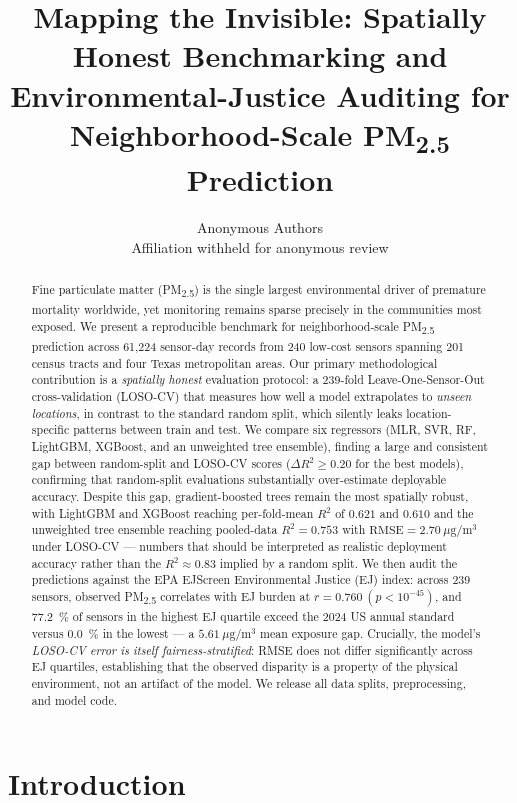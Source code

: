 \documentclass{article}
\title{Mapping the Invisible: Spatially Honest Benchmarking and\\
  Environmental-Justice Auditing for Neighborhood-Scale PM\textsubscript{2.5} Prediction}
\author{%
  Anonymous Authors \\
  Affiliation withheld for anonymous review
}
\begin{document}
\maketitle

\begin{abstract}
Fine particulate matter (PM\textsubscript{2.5}) is the single largest environmental driver of premature mortality worldwide, yet monitoring remains sparse precisely in the communities most exposed. We present a reproducible benchmark for neighborhood-scale PM\textsubscript{2.5} prediction across 61{,}224 sensor-day records from 240 low-cost sensors spanning 201 census tracts and four Texas metropolitan areas. Our primary methodological contribution is a \emph{spatially honest} evaluation protocol: a 239-fold Leave-One-Sensor-Out cross-validation (LOSO-CV) that measures how well a model extrapolates to \emph{unseen locations}, in contrast to the standard random split, which silently leaks location-specific patterns between train and test. We compare six regressors (MLR, SVR, RF, LightGBM, XGBoost, and an unweighted tree ensemble), finding a large and consistent gap between random-split and LOSO-CV scores ($\Delta R^2 \geq 0.20$ for the best models), confirming that random-split evaluations substantially over-estimate deployable accuracy. Despite this gap, gradient-boosted trees remain the most spatially robust, with LightGBM and XGBoost reaching per-fold-mean $R^2$ of $0.621$ and $0.610$ and the unweighted tree ensemble reaching pooled-data $R^2 = 0.753$ with $\mathrm{RMSE} = 2.70~\mu\mathrm{g}/\mathrm{m}^3$ under LOSO-CV --- numbers that should be interpreted as realistic deployment accuracy rather than the $R^2 \approx 0.83$ implied by a random split. We then audit the predictions against the EPA EJScreen Environmental Justice (EJ) index: across 239 sensors, observed PM\textsubscript{2.5} correlates with EJ burden at $r = 0.760~(p < 10^{-45})$, and \SI{77.2}{\percent} of sensors in the highest EJ quartile exceed the 2024 US annual standard versus \SI{0.0}{\percent} in the lowest --- a $5.61~\mu\mathrm{g}/\mathrm{m}^3$ mean exposure gap. Crucially, the model's \emph{LOSO-CV error is itself fairness-stratified}: RMSE does not differ significantly across EJ quartiles, establishing that the observed disparity is a property of the physical environment, not an artifact of the model. We release all data splits, preprocessing, and model code.
\end{abstract}

\section{Introduction}
\end{document}
